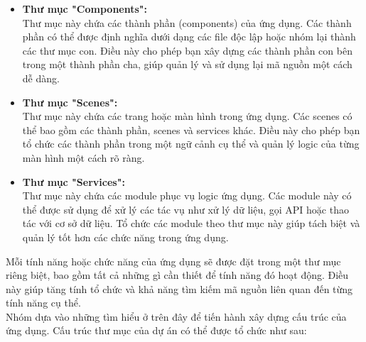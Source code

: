 \begin{itemize}
    \item \textbf{Thư mục "Components":}\\
    Thư mục này chứa các thành phần (components) của ứng dụng. Các thành phần có thể được định nghĩa dưới dạng các file độc lập hoặc nhóm lại thành các thư mục con. Điều này cho phép bạn xây dựng các thành phần con bên trong một thành phần cha, giúp quản lý và sử dụng lại mã nguồn một cách dễ dàng.
    \item \textbf{Thư mục "Scenes":}\\
    Thư mục này chứa các trang hoặc màn hình trong ứng dụng. Các scenes có thể bao gồm các thành phần, scenes và services khác. Điều này cho phép bạn tổ chức các thành phần trong một ngữ cảnh cụ thể và quản lý logic của từng màn hình một cách rõ ràng.
    \item \textbf{Thư mục "Services":}\\
    Thư mục này chứa các module phục vụ logic ứng dụng. Các module này có thể được sử dụng để xử lý các tác vụ như xử lý dữ liệu, gọi API hoặc thao tác với cơ sở dữ liệu. Tổ chức các module theo thư mục này giúp tách biệt và quản lý tốt hơn các chức năng trong ứng dụng.

\end{itemize}
    Mỗi tính năng hoặc chức năng của ứng dụng sẽ được đặt trong một thư mục riêng biệt, bao gồm tất cả những gì cần thiết để tính năng đó hoạt động. Điều này giúp tăng tính tổ chức và khả năng tìm kiếm mã nguồn liên quan đến từng tính năng cụ thể.\\

Nhóm dựa vào những tìm hiểu ở trên đây để tiến hành xây dựng cấu trúc của ứng dụng. Cấu trúc thư mục của dự án có thể được tổ chức như sau:

